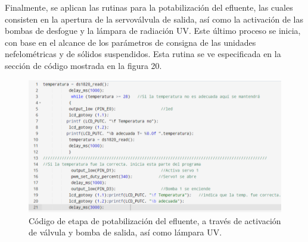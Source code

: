 \documentclass[conference]{IEEEtran}
\begin{document}
Finalmente, se aplican las rutinas para la potabilización del efluente, las cuales consisten en la apertura de la servoválvula de salida, así como la activación de las bombas de desfogue y la lámpara de radiación UV. Este último proceso se inicia, con base en el alcance de los parámetros de consigna de las unidades nefelométricas y de sólidos suspendidos. Esta rutina se ve especificada en la sección de código mostrada en la figura 20.

\begin{figure}[htbp]
	\centering
	\includegraphics[width=0.9\columnwidth]{fig19.png}
	\caption{Código de etapa de potabilización del efluente, a través de activación de válvula y bomba de salida, así como lámpara UV.}
	\label{fig:sensor-ph-temperatura}
\end{figure}
\end{document}
